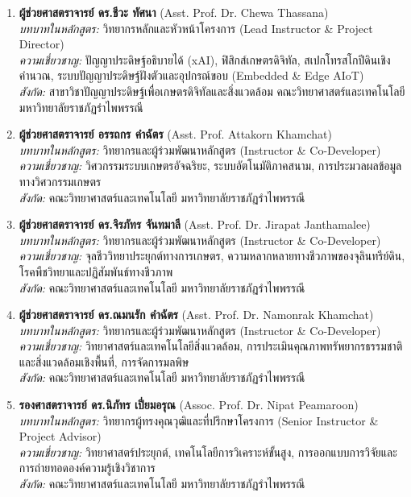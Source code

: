 \begin{enumerate}
    \item \textbf{ผู้ช่วยศาสตราจารย์ ดร.ชีวะ ทัศนา} (Asst. Prof. Dr. Chewa Thassana)\\
    \textit{บทบาทในหลักสูตร:} วิทยากรหลักและหัวหน้าโครงการ (Lead Instructor \& Project Director)\\
    \textit{ความเชี่ยวชาญ:} ปัญญาประดิษฐ์อธิบายได้ (xAI), ฟิสิกส์เกษตรดิจิทัล, สเปกโทรสโกปีดินเชิงคำนวณ, ระบบปัญญาประดิษฐ์ฝังตัวและอุปกรณ์ขอบ (Embedded \& Edge AIoT)\\
    \textit{สังกัด:} สาขาวิชาปัญญาประดิษฐ์เพื่อเกษตรดิจิทัลและสิ่งแวดล้อม คณะวิทยาศาสตร์และเทคโนโลยี มหาวิทยาลัยราชภัฏรำไพพรรณี

    \item \textbf{ผู้ช่วยศาสตราจารย์ อรรถกร คำฉัตร} (Asst. Prof. Attakorn Khamchat)\\
    \textit{บทบาทในหลักสูตร:} วิทยากรและผู้ร่วมพัฒนาหลักสูตร (Instructor \& Co-Developer)\\
    \textit{ความเชี่ยวชาญ:} วิศวกรรมระบบเกษตรอัจฉริยะ, ระบบอัตโนมัติภาคสนาม, การประมวลผลข้อมูลทางวิศวกรรมเกษตร\\
    \textit{สังกัด:} คณะวิทยาศาสตร์และเทคโนโลยี มหาวิทยาลัยราชภัฏรำไพพรรณี

    \item \textbf{ผู้ช่วยศาสตราจารย์ ดร.จิรภัทร จันทมาลี} (Asst. Prof. Dr. Jirapat Janthamalee)\\
    \textit{บทบาทในหลักสูตร:} วิทยากรและผู้ร่วมพัฒนาหลักสูตร (Instructor \& Co-Developer)\\
    \textit{ความเชี่ยวชาญ:} จุลชีววิทยาประยุกต์ทางการเกษตร, ความหลากหลายทางชีวภาพของจุลินทรีย์ดิน, โรคพืชวิทยาและปฏิสัมพันธ์ทางชีวภาพ\\
    \textit{สังกัด:} คณะวิทยาศาสตร์และเทคโนโลยี มหาวิทยาลัยราชภัฏรำไพพรรณี

    \item \textbf{ผู้ช่วยศาสตราจารย์ ดร.ณมนรัก คำฉัตร} (Asst. Prof. Dr. Namonrak Khamchat)\\
    \textit{บทบาทในหลักสูตร:} วิทยากรและผู้ร่วมพัฒนาหลักสูตร (Instructor \& Co-Developer)\\
    \textit{ความเชี่ยวชาญ:} วิทยาศาสตร์และเทคโนโลยีสิ่งแวดล้อม, การประเมินคุณภาพทรัพยากรธรรมชาติและสิ่งแวดล้อมเชิงพื้นที่, การจัดการมลพิษ\\
    \textit{สังกัด:} คณะวิทยาศาสตร์และเทคโนโลยี มหาวิทยาลัยราชภัฏรำไพพรรณี

    \item \textbf{รองศาสตราจารย์ ดร.นิภัทร เปี่ยมอรุณ} (Assoc. Prof. Dr. Nipat Peamaroon)\\
    \textit{บทบาทในหลักสูตร:} วิทยากรผู้ทรงคุณวุฒิและที่ปรึกษาโครงการ (Senior Instructor \& Project Advisor)\\
    \textit{ความเชี่ยวชาญ:} วิทยาศาสตร์ประยุกต์, เทคโนโลยีการวิเคราะห์ขั้นสูง, การออกแบบการวิจัยและการถ่ายทอดองค์ความรู้เชิงวิชาการ\\
    \textit{สังกัด:} คณะวิทยาศาสตร์และเทคโนโลยี มหาวิทยาลัยราชภัฏรำไพพรรณี


\end{enumerate}
